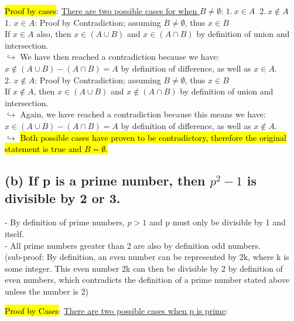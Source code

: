 \documentclass[a4paper, 12pt]{article}
\begin{document}
\hl{Proof by cases}: \underline{There are two possible cases for when $B\neq \emptyset$}: $1.\:x \in A\:$ $2.\: x \notin A$\\

1. \underline{$x \in A$}: Proof by Contradiction; assuming $B\neq \emptyset$, thus $x \in B$\\

If $x \in  A$ also, then $x\in (A \cup B)$ and $x \in (A\cap B)$ by definition of union and intersection.\\
$\hookrightarrow$ We have then reached a contradiction because we have:\\
$x \notin (A\cup B) - (A\cap B) = A$ by definition of difference, as well as $x\in A.$\\

2. \underline{$x \notin A$}: Proof by Contradiction; assuming $B\neq \emptyset$, thus $x \in B$\\

If $x\notin A$, then $x\in (A\cup B)$ and $x\notin (A\cap B)$ by definition of union and intersection.\\
$\hookrightarrow$ Again, we have reached a contradiction because this means we have:\\
$x \in (A\cup B) - (A\cap B) = A$ by definition of difference, as well as $x\notin A.$\\

$\hookrightarrow$ \hl{Both possible cases have proven to be contradictory, therefore the original statement is true and $B = \emptyset$.}

\subsection*{(b) If p is a prime number, then $p^2-1$ is divisible by 2 or 3.}

- By definition of prime numbers, $p > 1$ and p must only be divisible by 1 and itself.\\

- All prime numbers greater than 2 are also by definition odd numbers.\\
(sub-proof: By definition, an even number can be represented by 2k, where k is some integer. This even number 2k can then be divisible by 2 by definition of even numbers, which contradicts the definition of a prime number stated above unless the number is 2)\\
\pagebreak

\hl{Proof by Cases}: \underline{There are two possible cases when p is prime}: \\
\end{document}
